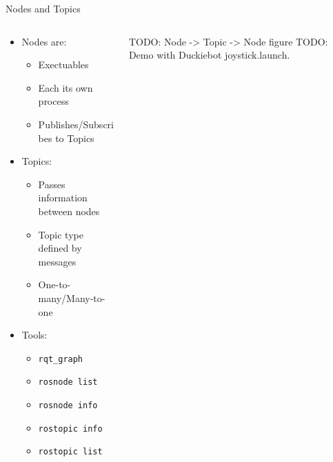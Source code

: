 \documentclass{beamer}
\begin{document}
\begin{frame}{Nodes and Topics}
	\begin{columns}
		\begin{column}{0.6\textwidth}
			\begin{itemize}
				\item Nodes are:
					\begin{itemize}
					\item Exectuables
					\item Each its own process
					\item Publishes/Subscribes to Topics
					\end{itemize}
				\item Topics:
					\begin{itemize}
					\item Passes information between nodes
					\item Topic type defined by messages
					\item One-to-many/Many-to-one
					\end{itemize}
				\item Tools:
					\begin{itemize}
					\item \texttt{rqt_graph}
					\item \texttt{rosnode list}
					\item \texttt{rosnode info}
					\item \texttt{rostopic info}
					\item \texttt{rostopic list}
					\end{itemize}
			\end{itemize}
		\end{column}
		\begin{column}{0.4\textwidth}
			\centering
			TODO: Node -> Topic -> Node figure
			TODO: Demo with Duckiebot joystick.launch.
		\end{column}
	\end{columns}
\end{frame}
\end{document}
